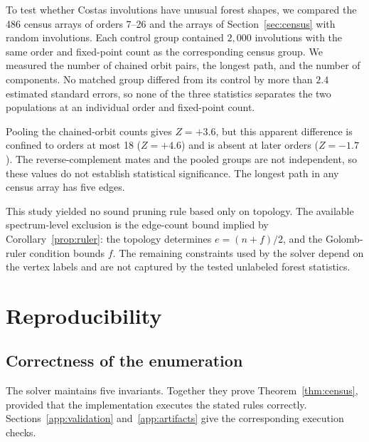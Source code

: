 \documentclass[11pt]{article}
\begin{document}
To test whether Costas involutions have unusual forest shapes, we compared
the 486 census arrays of orders 7--26 and the arrays of
Section~\ref{sec:census} with random involutions.  Each control group
contained $2{,}000$ involutions with the same order and fixed-point count
as the corresponding census group.  We measured the number of chained
orbit pairs, the longest path, and the number of components.  No matched
group differed from its control by more than $2.4$ estimated standard
errors, so none of the three statistics separates the two populations at
an individual order and fixed-point count.

Pooling the chained-orbit counts gives $Z=+3.6$, but this apparent
difference is confined to orders at most 18 ($Z=+4.6$) and is absent at
later orders ($Z=-1.7$).  The reverse-complement mates and the pooled
groups are not independent, so these values do not establish statistical
significance.  The longest path in any census array has five edges.

This study yielded no sound pruning rule based only on topology.  The
available spectrum-level exclusion is the edge-count bound implied by
Corollary~\ref{prop:ruler}: the topology determines
$e=(n+f)/2$, and the Golomb-ruler condition bounds $f$.  The remaining
constraints used by the solver depend on the vertex labels and are not
captured by the tested unlabeled forest statistics.

\section{Reproducibility}
\label{app:repro}

\subsection{Correctness of the enumeration}

The solver maintains five invariants.  Together they prove
Theorem~\ref{thm:census}, provided that the implementation executes the
stated rules correctly.  Sections~\ref{app:validation}
and~\ref{app:artifacts} give the corresponding execution checks.
\end{document}
